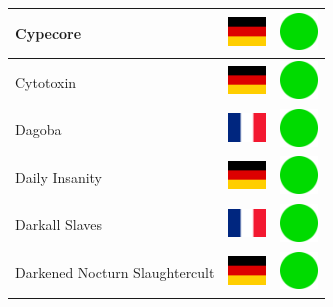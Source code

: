 \documentclass[12pt, a4paper, twoside]{report}
\begin{document}
\begin{center}
\begin{longtable}{|p{5cm}|p{2cm}|p{2cm}|}
Cypecore & \includegraphics[width=1cm]{4x3/de} & \includegraphics[width=1cm]{likes/y} \\ \hline
Cytotoxin & \includegraphics[width=1cm]{4x3/de} & \includegraphics[width=1cm]{likes/y} \\ \hline
Dagoba & \includegraphics[width=1cm]{4x3/fr} & \includegraphics[width=1cm]{likes/y} \\ \hline
Daily Insanity & \includegraphics[width=1cm]{4x3/de} & \includegraphics[width=1cm]{likes/y} \\ \hline
Darkall Slaves & \includegraphics[width=1cm]{4x3/fr} & \includegraphics[width=1cm]{likes/y} \\ \hline
Darkened Nocturn Slaughtercult & \includegraphics[width=1cm]{4x3/de} & \includegraphics[width=1cm]{likes/y} \\ \hline

\end{longtable}
\end{center}
\end{document}

